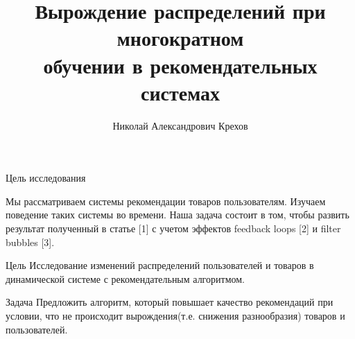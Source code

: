 \documentclass{beamer}
\title[\hbox to 56mm{Многократное обучение}]{Вырождение распределений при  многократном  \\ обучении в рекомендательных системах}
\author[Н.\,А.~Крехов]{Николай Александрович Крехов}
\institute{Московский физико-технический институт}
\date{\footnotesize
\par\smallskip\emph{Курс:} Моя первая научная статья
\par\smallskip\emph{Эксперт:} к.ф.-м.н. А.\,С.~Хританков
\par\smallskip\emph{Консультант:} А.\,С.~Веприков
\par\bigskip\small 2024}
\begin{document}

\begin{frame}

    \thispagestyle{empty}
    \maketitle
    
\end{frame}


\begin{frame}{Цель исследования}

Мы рассматриваем системы рекомендации товаров пользователям. Изучаем поведение таких системы во времени. Наша задача состоит в том, чтобы развить результат полученный в статье [1] с учетом эффектов feedback loops [2] и filter bubbles [3].
    \begin{block}{Цель}
        Исследование изменений распределений пользователей и товаров в динамической системе с рекомендательным алгоритмом.
    \end{block}
    \begin{block}{Задача}
        Предложить алгоритм, который повышает качество рекомендаций при условии, что не происходит вырождения(т.е. снижения разнообразия) товаров и пользователей.
    \end{block}

\end{frame}








    
\end{document}

